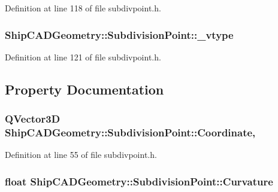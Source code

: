Definition at line 118 of file subdivpoint.\-h.

\hypertarget{classShipCADGeometry_1_1SubdivisionPoint_a9ffc795a56a1b963ba29725be17be266}{
\subsubsection[{\-\_\-vtype}]{ Ship\-C\-A\-D\-Geometry\-::\-Subdivision\-Point\-::\-\_\-vtype\hspace{0.3cm}{\ttfamily [protected]}}}\label{classShipCADGeometry_1_1SubdivisionPoint_a9ffc795a56a1b963ba29725be17be266}


Definition at line 121 of file subdivpoint.\-h.



\subsection{Property Documentation}
\hypertarget{classShipCADGeometry_1_1SubdivisionPoint_a4a8b002061482e596fb9228a8968cd57}{
\subsubsection[{Coordinate}]{\setlength{\rightskip}{0pt plus 5cm}Q\-Vector3\-D Ship\-C\-A\-D\-Geometry\-::\-Subdivision\-Point\-::\-Coordinate\hspace{0.3cm}{\ttfamily [read]}, {\ttfamily [write]}}}\label{classShipCADGeometry_1_1SubdivisionPoint_a4a8b002061482e596fb9228a8968cd57}


Definition at line 55 of file subdivpoint.\-h.

\hypertarget{classShipCADGeometry_1_1SubdivisionPoint_a7ca022ae7a31b478234ee212a24e3047}{
\subsubsection[{Curvature}]{\setlength{\rightskip}{0pt plus 5cm}float Ship\-C\-A\-D\-Geometry\-::\-Subdivision\-Point\-::\-Curvature\hspace{0.3cm}{\ttfamily [read]}}}\label{classShipCADGeometry_1_1SubdivisionPoint_a7ca022ae7a31b478234ee212a24e3047}


